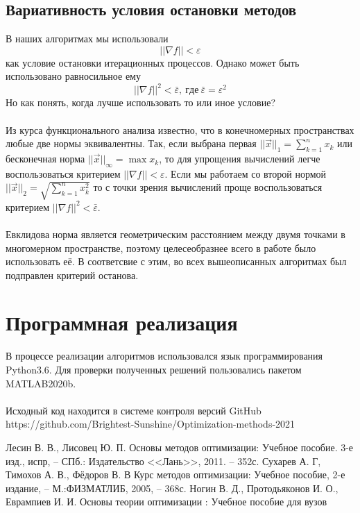 \documentclass{article}
\begin{document}
\subsection{Вариативность условия остановки методов}
\noindent В наших алгоритмах мы использовали $$||\nabla f||<\varepsilon$$ как условие остановки итерационных процессов. Однако может быть использовано равносильное ему $$||\nabla f||^{2}<\bar \varepsilon,~ где ~ \bar \varepsilon = \varepsilon^{2}$$ Но как понять, когда лучше использовать то или иное условие?\\\\
\noindent Из курса функционального анализа известно, что в конечномерных пространствах любые две нормы эквивалентны. Так, если выбрана первая $||\overrightarrow{x}||_{1}=\sum\limits_{k=1}^n x_k$ или бесконечная норма $||\overrightarrow{x}||_{\infty}=\max x_k$, то для упрощения вычислений легче воспользоваться критерием $||\nabla f||<\varepsilon$. Если мы работаем со второй нормой $||\overrightarrow{x}||_{2}=\sqrt{\sum\limits_{k=1}^n x_k^{2}}$ то с точки зрения вычислений проще воспользоваться критерием $||\nabla f||^{2}<\bar \varepsilon$. 
\\\\
Евклидова норма является геометрическим расстоянием между двумя точками в многомерном пространстве, поэтому целесеобразнее всего в работе было использовать её. В соответсвие с этим, во всех вышеописанных алгоритмах был подправлен критерий останова.

\section{Программная реализация}
\noindent В процессе реализации алгоритмов использовался язык программирования Python3.6. Для проверки полученных решений пользовались пакетом MATLAB2020b.
\\\\
\noindent Исходный код находится в системе контроля версий GitHub 
\\
https://github.com/Brightest-Sunshine/Optimization-methods-2021

\begin{thebibliography}{9}
 Лесин В. В., Лисовец Ю. П. Основы методов оптимизации: Учебное пособие. 3-е изд., испр, -- СПб.: Издательство <<Лань>>, 2011. -- 352с.
 Сухарев А. Г, Тимохов А. В., Фёдоров В. В Курс методов оптимизации: Учебное пособие, 2-е издание, -- М.:ФИЗМАТЛИБ, 2005, -- 368с.
 Ногин В. Д., Протодьяконов И. О., Еврампиев И. И. Основы теории оптимизации : Учебное пособие для вузов
\end{thebibliography}
\end{document}

